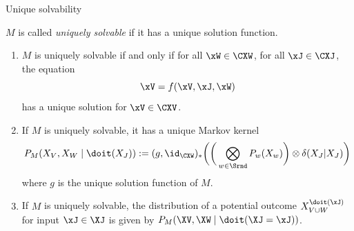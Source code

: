 \begin{frame}{Unique solvability}
  \begin{Def}[\ref{def:scm_unique_solvability}]
  $M$ is called \emph{uniquely solvable} if it has a unique solution function. 
  \end{Def}
  \begin{Thm}[\ref{thm:scm_unique_solvability}]
  \begin{enumerate}
    \item $M$ is uniquely solvable if and only if 
      for all $\xW\in\CXW$, for all $\xJ \in \CXJ$, the equation
      $$\xV = f(\xV,\xJ,\xW)$$
      has a unique solution for $\xV\in\CXV$.
    \item If $M$ is uniquely solvable, it has a unique Markov kernel
      $$P_{M}(X_V,X_W \mid \doit(X_J)) := (g,\id_{\CXW})_* \bigg( \bigg( \bigotimes_{w\in\Srnd} P_w(X_w) \bigg) \otimes \delta(X_J|X_J) \bigg)$$
      where $g$ is the unique solution function of $M$.
    \item If $M$ is uniquely solvable, the distribution of a potential outcome $X^{\doit(\xJ)}_{V\cup W}$ for input $\xJ\in\XJ$ is given by $P_{M}(\XV,\XW \mid \doit(\XJ=\xJ))$.
  \end{enumerate}
\end{Thm}
\end{frame}

%


